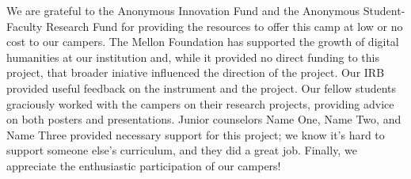 \begin{acks}
{\small
We are grateful to the Anonymous Innovation Fund and the Anonymous
Student-Faculty Research Fund for providing the resources to offer
this camp at low or no cost to our campers.  The Mellon Foundation
has supported the growth of digital humanities at our institution
and, while it provided no direct funding to this project, that
broader iniative influenced the direction of the project.  Our IRB
provided useful feedback on the instrument and the project.  Our
fellow students graciously worked with the campers on their research
projects, providing advice on both posters and presentations.  Junior
counselors Name One, Name Two, and Name Three provided necessary
support for this project; we know it's hard to support someone
else's curriculum, and they did a great job.  Finally, we appreciate
the enthusiastic participation of our campers!
}
\end{acks}
